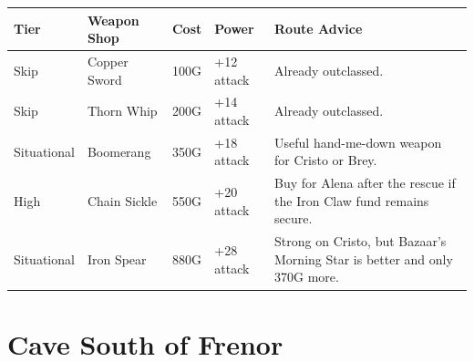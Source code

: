 \documentclass[
  american,
  10pt,
  letterpaper,
  oneside,
  open=any]{scrreprt}
\newcounter{none} %
\newenvironment{guidetable}{%
  \small\setstretch{1.0}%
  \setlength{\tabcolsep}{4pt}%
  \setlength{\LTpre}{8pt}\setlength{\LTpost}{10pt}%
  \renewcommand{\arraystretch}{1.16}%
}{ }
\begin{document}
\begin{guidetable}

{\def\LTcaptype{none} %
\begin{longtable}[]{@{}
  >{\raggedright\arraybackslash}p{}
  >{\raggedright\arraybackslash}p{}
  >{\raggedleft\arraybackslash}p{}
  >{\raggedleft\arraybackslash}p{}
  >{\raggedright\arraybackslash}p{}@{}}
\toprule\noalign{}
\begin{minipage}[b]{\linewidth}\raggedright
\color{GuideGreen}\bfseries Tier
\end{minipage} & \begin{minipage}[b]{\linewidth}\raggedright
\color{GuideGreen}\bfseries Weapon Shop
\end{minipage} & \begin{minipage}[b]{\linewidth}\raggedleft
\color{GuideGreen}\bfseries Cost
\end{minipage} & \begin{minipage}[b]{\linewidth}\raggedleft
\color{GuideGreen}\bfseries Power
\end{minipage} & \begin{minipage}[b]{\linewidth}\raggedright
\color{GuideGreen}\bfseries Route Advice
\end{minipage} \\
\midrule\noalign{}
\endhead
\bottomrule\noalign{}
\endlastfoot
Skip & Copper Sword & 100G & +12 attack & Already outclassed. \\
Skip & Thorn Whip & 200G & +14 attack & Already outclassed. \\
Situational & Boomerang & 350G & +18 attack & Useful hand-me-down weapon
for Cristo or Brey. \\
High & Chain Sickle & 550G & +20 attack & Buy for Alena after the rescue
if the Iron Claw fund remains secure. \\
Situational & Iron Spear & 880G & +28 attack & Strong on Cristo, but
Bazaar's Morning Star is better and only 370G more. \\
\end{longtable}
}

\end{guidetable}

\section{Cave South of Frenor}\label{cave-south-of-frenor}
\end{document}
